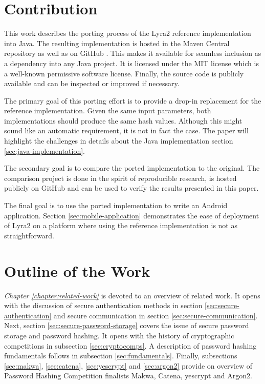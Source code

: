 \section{Contribution}
This work describes the porting process of the Lyra2 reference implementation into Java. The resulting implementation is hosted in the Maven Central repository \cite{maven:2017:lyra2} as well as on GitHub \cite{github:2017:lyra2-java}. This makes it available for seamless inclusion as a dependency into any Java project. It is licensed under the MIT license which is a well-known permissive software license. Finally, the source code is publicly available and can be inspected or improved if necessary.

The primary goal of this porting effort is to provide a drop-in replacement for the reference implementation. Given the same input parameters, both implementations should produce the same hash values. Although this might sound like an automatic requirement, it is not in fact the case. The paper will highlight the challenges in details about the Java implementation section \ref{sec:java-implementation}.

The secondary goal is to compare the ported implementation to the original. The comparison project is done in the spirit of reproducible research, is hosted publicly on GitHub \cite{github:2017:lyra2-compare} and can be used to verify the results presented in this paper.

The final goal is to use the ported implementation to write an Android application. Section \ref{sec:mobile-application} demonstrates the ease of deployment of Lyra2 on a platform where using the reference implementation is not as straightforward.

\section{Outline of the Work}

\emph{Chapter \ref{chapter:related-work}} is devoted to an overview of related work. It opens with the discussion of secure authentication methods in section \ref{sec:secure-authentication} and secure communication in section \ref{sec:secure-communication}. Next, section \ref{sec:secure-password-storage} covers the issue of secure password storage and password hashing. It opens with the history of cryptographic competitions in subsection \ref{sec:cryptocomps}. A description of password hashing fundamentals follows in subsection \ref{sec:fundamentals}. Finally, subsections \ref{sec:makwa}, \ref{sec:catena}, \ref{sec:yescrypt} and \ref{sec:argon2} provide on overview of Password Hashing Competition finalists Makwa, Catena, yescrypt and Argon2.

